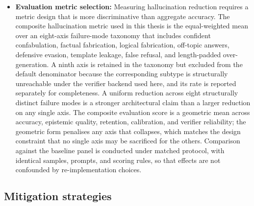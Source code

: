 \begin{itemize}
    \item \textbf{Evaluation metric selection:} Measuring hallucination reduction requires a metric design that is more discriminative than aggregate accuracy. The composite hallucination metric used in this thesis is the equal-weighted mean over an eight-axis failure-mode taxonomy that includes confident confabulation, factual fabrication, logical fabrication, off-topic answers, defensive evasion, template leakage, false refusal, and length-padded over-generation. A ninth axis is retained in the taxonomy but excluded from the default denominator because the corresponding subtype is structurally unreachable under the verifier backend used here, and its rate is reported separately for completeness. A uniform reduction across eight structurally distinct failure modes is a stronger architectural claim than a larger reduction on any single axis. The composite evaluation score is a geometric mean across accuracy, epistemic quality, retention, calibration, and verifier reliability; the geometric form penalises any axis that collapses, which matches the design constraint that no single axis may be sacrificed for the others. Comparison against the baseline panel is conducted under matched protocol, with identical samples, prompts, and scoring rules, so that effects are not confounded by re-implementation choices.
\end{itemize}

\subsection{Mitigation strategies}
\label{sec:scope-mitigations}

